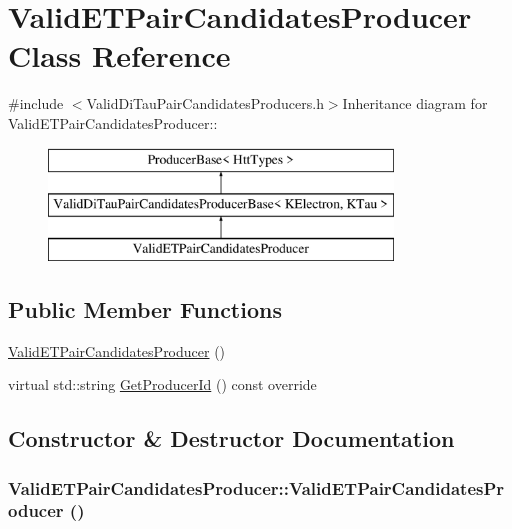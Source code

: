 \hypertarget{classValidETPairCandidatesProducer}{
\section{ValidETPairCandidatesProducer Class Reference}
\label{classValidETPairCandidatesProducer}
}


{\ttfamily \#include $<$ValidDiTauPairCandidatesProducers.h$>$}Inheritance diagram for ValidETPairCandidatesProducer::\begin{figure}[H]
\begin{center}
\leavevmode
\includegraphics[height=3cm]{classValidETPairCandidatesProducer}
\end{center}
\end{figure}
\subsection*{Public Member Functions}
\begin{DoxyCompactItemize}
\item 
\hyperlink{classValidETPairCandidatesProducer_aa5f20470043f51c305b99de691e976d3}{ValidETPairCandidatesProducer} ()
\item 
virtual std::string \hyperlink{classValidETPairCandidatesProducer_ac1a930e7ae92e41bb839368dd93e4af3}{GetProducerId} () const override
\end{DoxyCompactItemize}


\subsection{Constructor \& Destructor Documentation}
\hypertarget{classValidETPairCandidatesProducer_aa5f20470043f51c305b99de691e976d3}{
\subsubsection[{ValidETPairCandidatesProducer}]{\setlength{\rightskip}{0pt plus 5cm}ValidETPairCandidatesProducer::ValidETPairCandidatesProducer ()}}
\label{classValidETPairCandidatesProducer_aa5f20470043f51c305b99de691e976d3}


